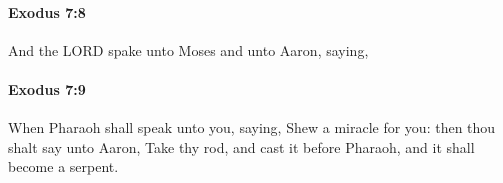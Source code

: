 		\paragraph{Exodus 7:8} %
			\label{EXODUS-7-8}

			And the LORD spake unto Moses and unto Aaron, saying,


		\paragraph{Exodus 7:9} %
			\label{EXODUS-7-9}

			When Pharaoh shall speak unto you, saying, Shew a miracle for you: then thou shalt say unto Aaron, Take thy rod, and cast it before Pharaoh, and it shall become a serpent.


